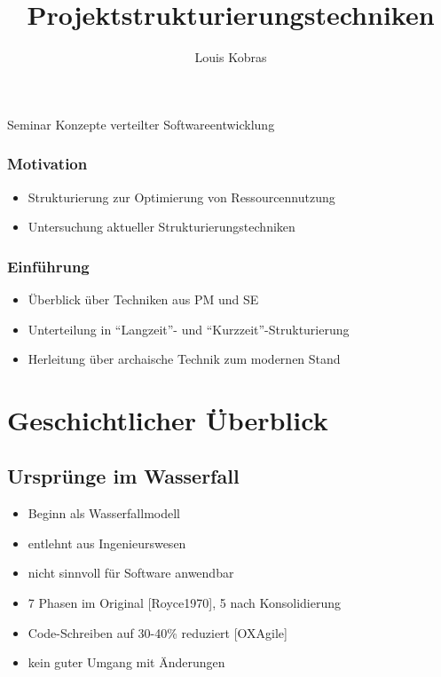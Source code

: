 \documentclass[%
	handout
]{beamer}
\author{Louis Kobras}
\title{Projektstrukturierungstechniken}
\newcommand{\waterfall}{[Royce1970]}
\newcommand{\waterfallmodel}{[OXAgile]}
\begin{document}
\begin{frame}
	\maketitle
	\vspace{-0.2cm}
	\begin{center}
		Seminar Konzepte verteilter Softwareentwicklung
	\end{center}
\end{frame}

\begin{frame}
	\frametitle{Motivation}
	\begin{itemize}
		\item Strukturierung zur Optimierung von Ressourcennutzung
		\item Untersuchung aktueller Strukturierungstechniken
	\end{itemize}
\end{frame}

\begin{frame}
	\frametitle{Einführung}
	\begin{itemize}
		\item Überblick über Techniken aus PM und SE
		\item Unterteilung in ``Langzeit''- und ``Kurzzeit''-Strukturierung
		\item Herleitung über archaische Technik zum modernen Stand
	\end{itemize}
\end{frame}

\begin{frame}
	\tableofcontents
\end{frame}

\section{Geschichtlicher Überblick}
	\subsection{Ursprünge im Wasserfall}
		\begin{frame}
			\begin{itemize}
				\item Beginn als Wasserfallmodell\pause
				\item entlehnt aus Ingenieurswesen\pause
				\item nicht sinnvoll für Software anwendbar\pause
			\end{itemize}
			\pause
			\begin{itemize}
				\item 7 Phasen im Original \waterfall\pause, 5 nach Konsolidierung\pause
				\item Code-Schreiben auf 30-40\% reduziert \waterfallmodel\pause
				\item kein guter Umgang mit Änderungen
			\end{itemize}
		\end{frame}
		
\end{document}
